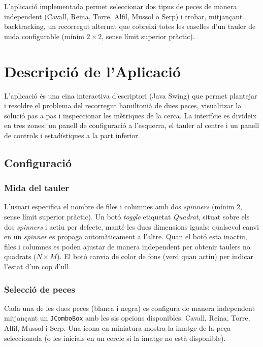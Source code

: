 \documentclass[conference,compsoc]{IEEEtran}
\begin{document}
L'aplicació implementada permet seleccionar dos tipus de peces de manera
independent (Cavall, Reina, Torre, Alfil, Mussol o Serp) i trobar, mitjançant
backtracking, un recorregut alternat que cobreixi totes les caselles
d'un tauler de mida configurable (mínim $2 \times 2$, sense límit superior pràctic).

\section{Descripció de l'Aplicació}

L'aplicació és una eina interactiva d'escriptori (Java Swing) que
permet plantejar i resoldre el problema del recorregut hamiltonià
de dues peces, visualitzar la solució pas a pas i inspeccionar les
mètriques de la cerca. La interfície es divideix en tres zones:
un panell de configuració a l'esquerra, el tauler al centre i un
panell de controls i estadístiques a la part inferior.

\subsection{Configuració}

\subsubsection{Mida del tauler}

L'usuari especifica el nombre de files i columnes amb dos
\textit{spinners} (mínim 2, sense límit superior pràctic). Un botó
\textit{toggle} etiquetat \textit{Quadrat}, situat sobre els dos
\textit{spinners} i actiu per defecte, manté les dues dimensions
iguals: qualsevol canvi en un \textit{spinner} es propaga
automàticament a l'altre. Quan el botó esta inactiu, files i columnes
es poden ajustar de manera independent per obtenir taulers no quadrats
($N \times M$). El botó canvia de color de fons (verd quan actiu) per
indicar l'estat d'un cop d'ull.

\subsubsection{Selecció de peces}

Cada una de les dues peces (blanca i negra) es configura de manera
independent mitjançant un \texttt{JComboBox} amb les sis opcions
disponibles: Cavall, Reina, Torre, Alfil, Mussol i Serp. Una icona
en miniatura mostra la imatge de la peça seleccionada (o les inicials
en un cercle si la imatge no està disponible).
\end{document}
